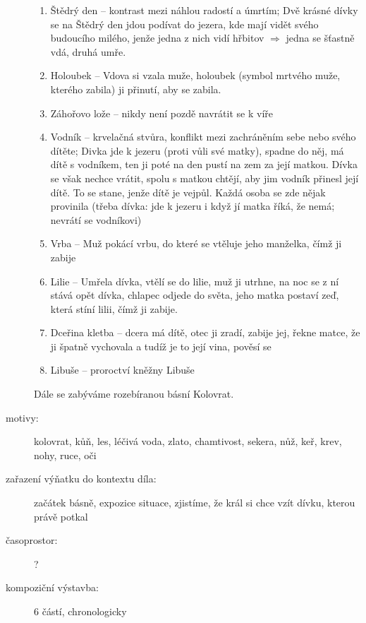 \documentclass{article}
\begin{document}
\begin{description}
\begin{enumerate}
        \item Štědrý den -- kontrast mezi náhlou radostí a úmrtím; Dvě krásné dívky se na Štědrý den jdou podívat do jezera, kde mají vidět svého budoucího milého, jenže jedna z nich vidí hřbitov $\Rightarrow$ jedna se šťastně vdá, druhá umře.
        \item Holoubek -- Vdova si vzala muže, holoubek (symbol mrtvého muže, kterého zabila) ji přinutí, aby se zabila.
        \item Záhořovo lože -- nikdy není pozdě navrátit se k víře
        \item Vodník -- krvelačná stvůra, konflikt mezi zachráněním sebe nebo svého dítěte; Divka jde k jezeru (proti vůli své matky), spadne do něj, má dítě s vodníkem, ten ji poté na den pustí na zem za její matkou. Dívka se však nechce vrátit, spolu s matkou chtějí, aby jim vodník přinesl její dítě. To se stane, jenže dítě je vejpůl. Každá osoba se zde nějak provinila (třeba dívka: jde k jezeru i když jí matka říká, že nemá; nevrátí se vodníkovi)
        \item Vrba -- Muž pokácí vrbu, do které se vtěluje jeho manželka, čímž ji zabije
        \item Lilie -- Umřela dívka, vtělí se do lilie, muž ji utrhne, na noc se z ní stává opět dívka, chlapec odjede do světa, jeho matka postaví zeď, která stíní lilii, čímž ji zabije.
        \item Dceřina kletba -- dcera má dítě, otec ji zradí, zabije jej, řekne matce, že ji špatně vychovala a tudíž je to její vina, pověsí se
        \item Libuše -- proroctví kněžny Libuše
    \end{enumerate}
Dále se zabýváme rozebíranou básní Kolovrat.
    \item[motivy:] kolovrat, kůň, les, léčivá voda, zlato, chamtivost, sekera, nůž, keř, krev, nohy, ruce, oči
    \item[zařazení výňatku do kontextu díla:] začátek básně, expozice situace, zjistíme, že král si chce vzít dívku, kterou právě potkal
    \item[časoprostor:] ?
    \item[kompoziční výstavba:] 6 částí, chronologicky
\end{description}
\end{document}
